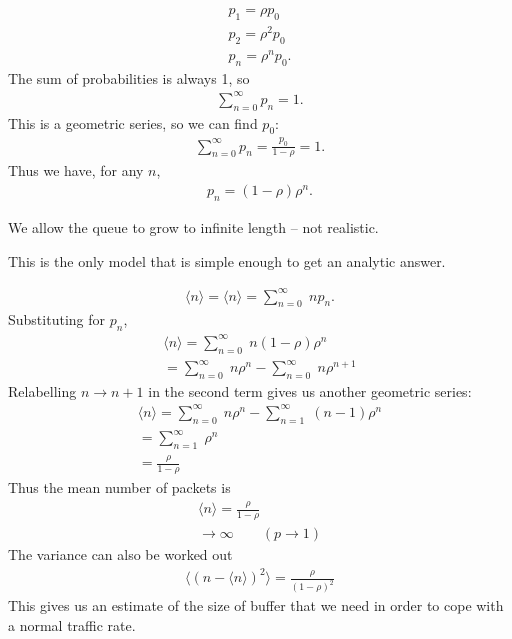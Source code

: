 \documentclass{slides}
\begin{document}
\begin{eqnarray}
p_1 = \rho p_0\nonumber\\
p_2 = \rho^2 p_0\nonumber\\
p_n = \rho^n p_0.\nonumber
\end{eqnarray}
The sum of probabilities is always 1, so
\begin{eqnarray}
\sum_{n=0}^\infty p_n = 1.\nonumber
\end{eqnarray}
This is a geometric series, so we can find $p_0$:
\begin{eqnarray}
\sum_{n=0}^\infty p_n = \frac{p_0}{1-\rho}= 1.\nonumber
\end{eqnarray}
Thus we have, for any $n$,
\begin{eqnarray}
p_n = (1-\rho)\rho^n.\nonumber
\end{eqnarray}


We allow the queue to grow to infinite length -- not realistic.

This is the only model that is simple enough to get an analytic answer.



\begin{eqnarray} 
\langle n \rangle = \langle n\rangle = \sum_{n=0}^\infty\;
np_n.\nonumber
\end{eqnarray}
Substituting for $p_n$,
\begin{eqnarray}
\langle n\rangle = \sum_{n=0}^\infty\; n (1-\rho)\rho^n\nonumber\\
= \sum_{n=0}^\infty\; n \rho^n - \sum_{n=0}^\infty\; n
\rho^{n+1}\nonumber
\end{eqnarray}
Relabelling $n\rightarrow n+1$ in the second term gives us another
geometric series:
\begin{eqnarray}
\langle n\rangle = \sum_{n=0}^\infty\; n \rho^n - \sum_{n=1}^\infty\; (n-1) \rho^{n}\nonumber\\
= \sum_{n=1}^\infty \; \rho^n\nonumber\\ =
\frac{\rho}{1-\rho}\nonumber
\end{eqnarray}
Thus the mean number of packets is
\begin{eqnarray}
\langle n\rangle = \frac{\rho}{1-\rho}\nonumber\\
\rightarrow \infty \qquad (p \rightarrow  1)\nonumber
\end{eqnarray}
The variance can also be worked out
\begin{eqnarray}
\langle (n-\langle n\rangle)^2\rangle = \frac{\rho}{(1-\rho)^2}\nonumber
\end{eqnarray}
This gives us an estimate of the size of buffer that we need in order
to cope with a normal traffic rate.
\end{document}
